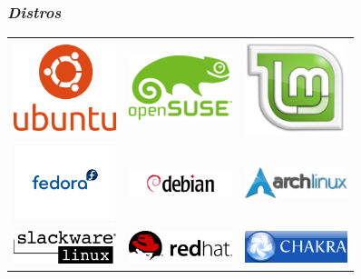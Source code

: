 \documentclass{beamer}
\begin{document}
\begin{frame}
   \frametitle{\emph{Distros}}
   \begin{center}
     \renewcommand\arraystretch{2}
     \begin{tabular}{c c c}
       \includegraphics[width=3cm]{images/ubuntu.png} & \includegraphics[width=3cm]{images/opensuse.png} & \includegraphics[width=3cm]{images/mint.jpg}\\
       \includegraphics[width=3cm,trim=10mm 60mm 10mm 60mm,clip]{images/fedora.jpg} & \includegraphics[width=3cm]{images/debian.png} & \includegraphics[width=3cm]{images/arch.png}\\
       \includegraphics[width=3cm]{images/slack.png} & \includegraphics[width=3cm]{images/redhat.jpg} & \includegraphics[width=3cm]{images/chakra.png}\\

\end{tabular}
\end{center}
\end{frame}
\end{document}
